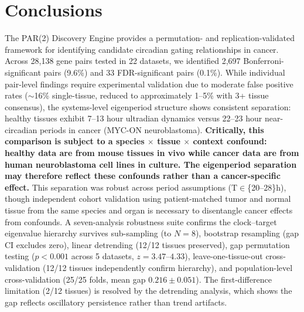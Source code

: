 \documentclass[11pt,a4paper]{article}
\begin{document}
\section{Conclusions}

The PAR(2) Discovery Engine provides a permutation- and replication-validated framework for identifying candidate circadian gating relationships in cancer. Across 28,138 gene pairs tested in 22 datasets, we identified 2,697 Bonferroni-significant pairs (9.6\%) and 33 FDR-significant pairs (0.1\%). While individual pair-level findings require experimental validation due to moderate false positive rates ($\sim$16\% single-tissue, reduced to approximately 1--5\% with 3+ tissue consensus), the systems-level eigenperiod structure shows consistent separation: healthy tissues exhibit 7--13 hour ultradian dynamics versus 22--23 hour near-circadian periods in cancer (MYC-ON neuroblastoma). \textbf{Critically, this comparison is subject to a species $\times$ tissue $\times$ context confound: healthy data are from mouse tissues in vivo while cancer data are from human neuroblastoma cell lines in culture. The eigenperiod separation may therefore reflect these confounds rather than a cancer-specific effect.} This separation was robust across period assumptions (T$\in$\{20--28\}h), though independent cohort validation using patient-matched tumor and normal tissue from the same species and organ is necessary to disentangle cancer effects from confounds. A seven-analysis robustness suite confirms the clock--target eigenvalue hierarchy survives sub-sampling (to $N=8$), bootstrap resampling (gap CI excludes zero), linear detrending (12/12 tissues preserved), gap permutation testing ($p < 0.001$ across 5 datasets, $z = 3.47$--$4.33$), leave-one-tissue-out cross-validation (12/12 tissues independently confirm hierarchy), and population-level cross-validation (25/25 folds, mean gap $0.216 \pm 0.051$). The first-difference limitation (2/12 tissues) is resolved by the detrending analysis, which shows the gap reflects oscillatory persistence rather than trend artifacts.
\end{document}
